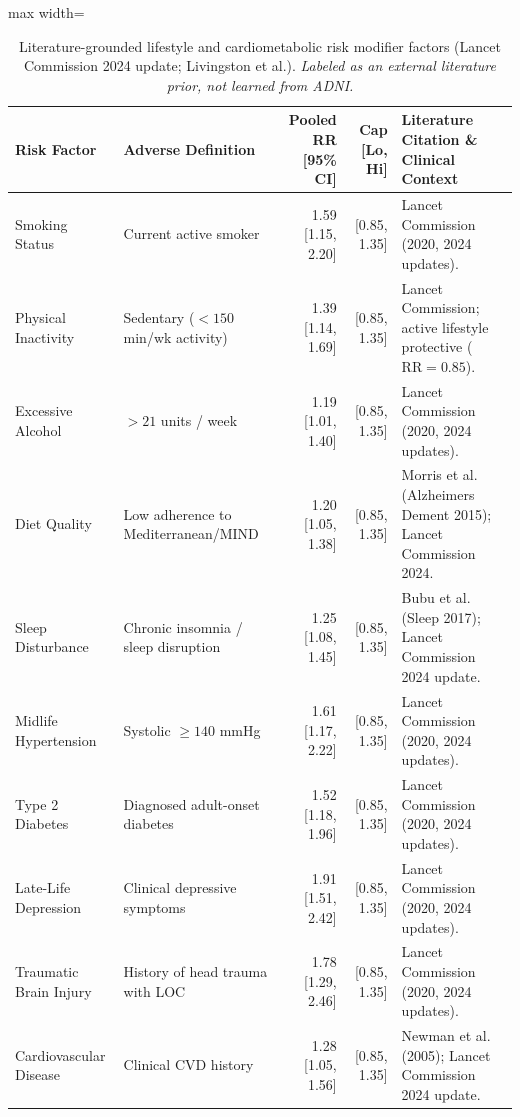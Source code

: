 \begin{table}[t]
\centering
\caption{Literature-grounded lifestyle and cardiometabolic risk modifier factors (Lancet Commission 2024 update; Livingston et al.). \textit{Labeled as an external literature prior, not learned from ADNI.}}
\label{tab:lifestyle_factors}
\small
\begin{adjustbox}{max width=\linewidth}
\begin{tabular}{llrrp{6.5cm}}
\toprule
\textbf{Risk Factor} & \textbf{Adverse Definition} & \textbf{Pooled RR [95\% CI]} & \textbf{Cap [Lo, Hi]} & \textbf{Literature Citation \& Clinical Context} \\
\midrule
Smoking Status        & Current active smoker               & 1.59 [1.15, 2.20] & [0.85, 1.35] & Lancet Commission (2020, 2024 updates). \\
Physical Inactivity   & Sedentary ($<150$ min/wk activity)  & 1.39 [1.14, 1.69] & [0.85, 1.35] & Lancet Commission; active lifestyle protective ($\text{RR}=0.85$). \\
Excessive Alcohol     & $>21$ units / week                  & 1.19 [1.01, 1.40] & [0.85, 1.35] & Lancet Commission (2020, 2024 updates). \\
Diet Quality          & Low adherence to Mediterranean/MIND & 1.20 [1.05, 1.38] & [0.85, 1.35] & Morris et al. (Alzheimers Dement 2015); Lancet Commission 2024. \\
Sleep Disturbance     & Chronic insomnia / sleep disruption & 1.25 [1.08, 1.45] & [0.85, 1.35] & Bubu et al. (Sleep 2017); Lancet Commission 2024 update. \\
Midlife Hypertension  & Systolic $\ge 140$ mmHg             & 1.61 [1.17, 2.22] & [0.85, 1.35] & Lancet Commission (2020, 2024 updates). \\
Type 2 Diabetes       & Diagnosed adult-onset diabetes      & 1.52 [1.18, 1.96] & [0.85, 1.35] & Lancet Commission (2020, 2024 updates). \\
Late-Life Depression  & Clinical depressive symptoms        & 1.91 [1.51, 2.42] & [0.85, 1.35] & Lancet Commission (2020, 2024 updates). \\
Traumatic Brain Injury& History of head trauma with LOC     & 1.78 [1.29, 2.46] & [0.85, 1.35] & Lancet Commission (2020, 2024 updates). \\
Cardiovascular Disease& Clinical CVD history                & 1.28 [1.05, 1.56] & [0.85, 1.35] & Newman et al. (2005); Lancet Commission 2024 update. \\
\bottomrule
\end{tabular}
\end{adjustbox}
\end{table}
